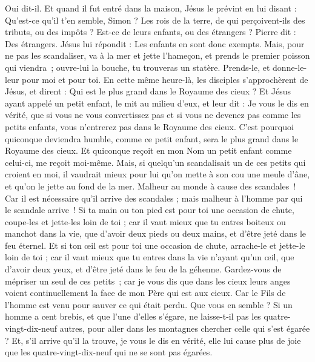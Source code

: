 \begin{multicols}{2}
{Oui dit-il. Et quand il fut entré dans la maison, Jésus le prévint en lui disant : Qu'est-ce qu'il t'en semble, Simon ? Les rois de la terre, de qui perçoivent-ils des tributs, ou des impôts ? Est-ce de leurs enfants, ou des étrangers ?
Pierre dit : Des étrangers. Jésus lui répondit : Les enfants en sont donc exempts.
Mais, pour ne pas les scandaliser, va à la mer et jette l'hameçon, et prends le premier poisson qui viendra ; ouvre-lui la bouche, tu trouveras un statère. Prends-le, et donne-le-leur pour moi et pour toi.
\VerseOne{}En cette même heure-là, les disciples s’approchèrent de Jésus, et dirent : Qui est le plus grand dans le Royaume des cieux ?
Et Jésus ayant appelé un petit enfant, le mit au milieu d'eux,
et leur dit : Je vous le dis en vérité, que si vous ne vous convertissez pas et si vous ne devenez pas comme les petits enfants, vous n'entrerez pas dans le Royaume des cieux.
C'est pourquoi quiconque deviendra humble, comme ce petit enfant, sera le plus grand dans le Royaume des cieux.
Et quiconque reçoit en mon Nom un petit enfant comme celui-ci, me reçoit moi-même.
Mais, si quelqu’un scandalisait un de ces petits qui croient en moi, il vaudrait mieux pour lui qu'on mette à son cou une meule d'âne, et qu'on le jette au fond de la mer.
Malheur au monde à cause des scandales ! Car il est nécessaire qu'il arrive des scandales ; mais malheur à l'homme par qui le scandale arrive !
Si ta main ou ton pied est pour toi une occasion de chute, coupe-les et jette-les loin de toi ; car il vaut mieux que tu entres boiteux ou manchot dans la vie, que d'avoir deux pieds ou deux mains, et d'être jeté dans le feu éternel.
Et si ton œil est pour toi une occasion de chute, arrache-le et jette-le loin de toi ; car il vaut mieux que tu entres dans la vie n'ayant qu'un œil, que d'avoir deux yeux, et d'être jeté dans le feu de la géhenne.
Gardez-vous de mépriser un seul de ces petits ; car je vous dis que dans les cieux leurs anges voient continuellement la face de mon Père qui est aux cieux.
Car le Fils de l'homme est venu pour sauver ce qui était perdu.
Que vous en semble ? Si un homme a cent brebis, et que l’une d’elles s’égare, ne laisse-t-il pas les quatre-vingt-dix-neuf autres, pour aller dans les montagnes chercher celle qui s'est égarée ?
Et, s'il arrive qu'il la trouve, je vous le dis en vérité, elle lui cause plus de joie que les quatre-vingt-dix-neuf qui ne se sont pas égarées.
}
\end{multicols}
